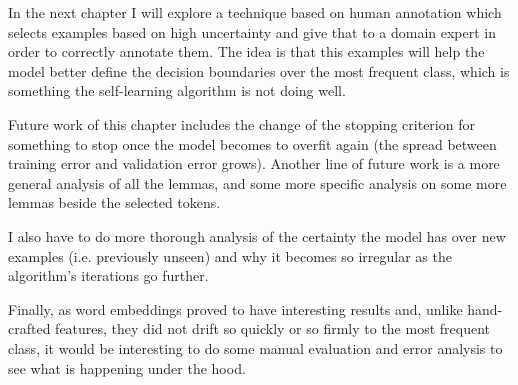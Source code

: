 In the next chapter I will explore a technique based on human annotation which
selects examples based on high uncertainty and give that to a domain expert in
order to correctly annotate them. The idea is that this examples will help the
model better define the decision boundaries over the most frequent class, which
is something the self-learning algorithm is not doing well.

Future work of this chapter includes the change of the stopping criterion for
something to stop once the model becomes to overfit again (the spread between
training error and validation error grows). Another line of future work is a
more general analysis of all the lemmas, and some more specific analysis on
some more lemmas beside the selected tokens.

I also have to do more thorough analysis of the certainty the model has over
new examples (i.e. previously unseen) and why it becomes so irregular as the
algorithm's iterations go further.

Finally, as word embeddings proved to have interesting results and, unlike
hand-crafted features, they did not drift so quickly or so firmly to the most
frequent class, it would be interesting to do some manual evaluation and error
analysis to see what is happening under the hood.
